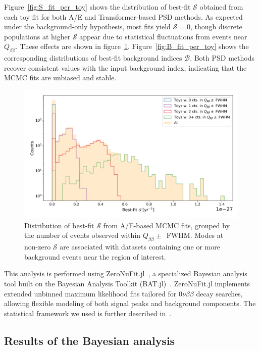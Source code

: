 Figure~\ref{fig:S_fit_per_toy} shows the distribution of best-fit $\mathcal{S}$ obtained from each toy fit for both A/E and Transformer-based PSD methods. As expected under the background-only hypothesis, most fits yield $\mathcal{S} = 0$, though discrete populations at higher $\mathcal{S}$ appear due to statistical fluctuations from events near $Q_{\beta \beta}$. These effects are shown in figure~\ref{fig:S_fit_per_ROIcount}. 
Figure~\ref{fig:B_fit_per_toy} shows the corresponding distributions of best-fit background indices $\mathcal{B}$. Both PSD methods recover consistent values with the input background index, indicating that the MCMC fits are unbiased and stable. 




\begin{figure}[t]
\centering
\includegraphics[width=0.9\linewidth]{figures/06_sensitivity/Signal_fits_per_ROIcount.png}
\caption{Distribution of best-fit $\mathcal{S}$ from A/E-based MCMC fits, grouped by the number of events observed within $Q_{\beta \beta} \pm$~FWHM. Modes at non-zero $\mathcal{S}$ are associated with datasets containing one or more background events near the region of interest.} 
\label{fig:S_fit_per_ROIcount}
\end{figure}


This analysis is performed using ZeroNuFit.jl~\cite{dixon_legend-expzeronufitjl_2025}, a specialized Bayesian analysis tool built on the Bayesian Analysis Toolkit (BAT.jl)~\cite{schulz_batjl_2021}. ZeroNuFit.jl implements extended unbinned maximum likelihood fits tailored for $0 \nu \beta \beta$ decay searches, allowing flexible modeling of both signal peaks and background components. The statistical framework we used is further described in~\cite{lnote_25001}. 



\subsection{Results of the Bayesian analysis}


